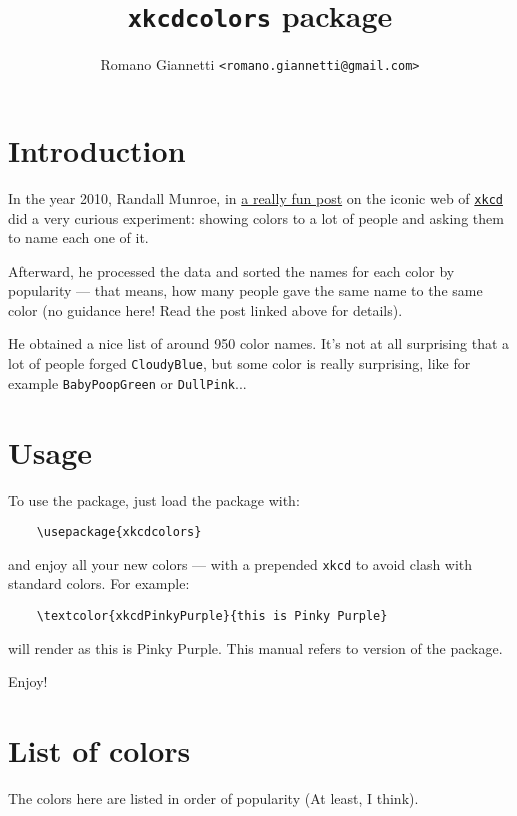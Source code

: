 \documentclass[12pt]{article}
\title{\texttt{xkcdcolors} package}
\author{Romano Giannetti \texttt{<romano.giannetti@gmail.com>}}
\begin{document}
\maketitle
\section{Introduction}

In the year 2010, Randall Munroe, in \href{https://blog.xkcd.com/2010/05/03/color-survey-results/}{a really fun post} on the iconic web of \href{https://xkcd.com/}{\texttt{xkcd}} did a very curious experiment: showing colors to a lot of people and asking them to name each one of it.

Afterward, he processed the data and sorted the names for each color by popularity --- that means, how many people gave the same name to the same color (no guidance here! Read the post linked above for details).

He obtained a nice list of around 950 color names. It's not at all surprising that a lot of people forged \texttt{CloudyBlue}, but some color is really surprising, like for example \texttt{BabyPoopGreen} or \texttt{DullPink}...

\section{Usage}
To use the package, just load the package with:

\begin{verbatim}
    \usepackage{xkcdcolors}
\end{verbatim}

\noindent and enjoy all your new colors --- with a prepended \texttt{xkcd} to avoid clash with standard colors. For example:

\begin{verbatim}
    \textcolor{xkcdPinkyPurple}{this is Pinky Purple}
\end{verbatim}

\noindent will render as \textcolor{xkcdPinkyPurple}{this is Pinky Purple}. This manual refers to version \texttt{\xkcdcolorsversion} of the package.

\bigskip

\noindent Enjoy!

\section{List of colors}
The colors here are listed in order of popularity (At least, I think).
\end{document}
